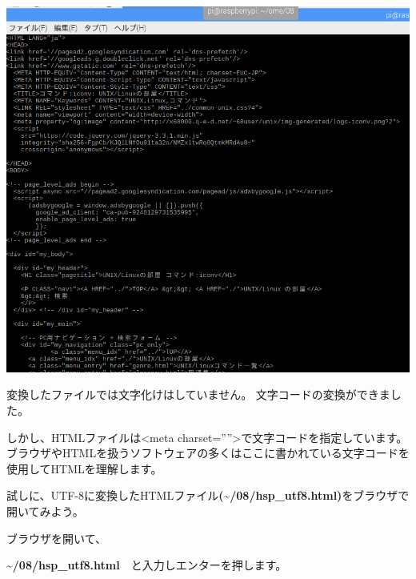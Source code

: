 \documentclass[a4paper,12pt,dvipdfmx]{jarticle}
\begin{document}
\begin{center}
\includegraphics[width=17.006cm,height=12.086cm]{textbook-img023.png}

\end{center}
変換したファイルでは文字化けはしていません。
文字コードの変換ができました。

\clearpage
しかし、HTMLファイルは{\textless}meta
charset=””{\textgreater}で文字コードを指定しています。
ブラウザやHTMLを扱うソフトウェアの多くはここに書かれている文字コードを使用してHTMLを理解します。

試しに、UTF-8に変換したHTMLファイル\textbf{(\~{}/08/hsp\_utf8.html)}をブラウザで開いてみよう。

ブラウザを開いて、

\textbf{\~{}/08/hsp\_utf8.html}　と入力しエンターを押します。
\end{document}
